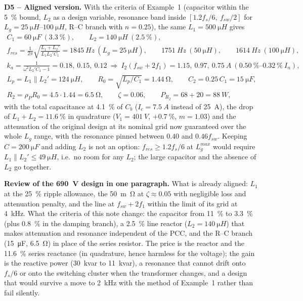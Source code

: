 \documentclass[10pt,a4paper]{scrartcl}
\newcommand{\fsw}{f_{sw}}
\newcommand{\fres}{f_{res}}
\newcommand{\Lg}{L_{g}}
\begin{document}
\begin{onehalfspace}
\textbf{D5 -- Aligned version.} With the criteria of Example~1 (capacitor within the \SI{5}{\percent} bound, $L_2$ as a design variable, resonance band inside $[1.2 f_s/6,\ \fsw/2]$ for $\Lg = \SIrange{25}{100}{\micro H}$, R--C branch with $n = 0.25$), the same $L_1 = \SI{500}{\micro H}$ gives
\begin{gather*}
C_1 = \SI{60}{\micro F}\ (\SI{3.3}{\percent}),\qquad L_2 = \SI{140}{\micro H}\ (\SI{2.5}{\percent}),\\
\fres = \frac{1}{2\pi}\sqrt{\frac{L_1 + L_2'}{L_1 L_2' C_1}} = \SI{1845}{Hz}\ (\Lg = \SI{25}{\micro H}),\qquad \SI{1751}{Hz}\ (\SI{50}{\micro H}),\qquad \SI{1614}{Hz}\ (\SI{100}{\micro H}),\\
k_a = \frac{1}{\omega^2 L_2' C_1 - 1} = 0.18,\ 0.15,\ 0.12\ \Rightarrow\ I_2(\fsw + 2f_1) = 1.15,\ 0.97,\ \SI{0.75}{A}\ (\SIrange{0.50}{0.32}{\percent}\ I_n),\\
L_p = L_1 \parallel L_2' = \SI{124}{\micro H},\qquad R_0 = \sqrt{L_p/C_1} = \SI{1.44}{\ohm},\qquad C_2 = 0.25\,C_1 = \SI{15}{\micro F},\\
R_2 = \rho_P R_0 = 4.5 \cdot 1.44 = \SI{6.5}{\ohm},\qquad \zeta = 0.06,\qquad P_{R_2} = 68 + 20 = \SI{88}{W},
\end{gather*}
with the total capacitance at \SI{4.1}{\percent} of $C_b$ ($I_c = \SI{7.5}{A}$ instead of \SI{25}{A}), the drop of $L_1 + L_2 = \SI{11.6}{\percent}$ in quadrature ($V_1 = \SI{401}{V}$, $+\SI{0.7}{\percent}$, $m = 1.03$) and the attenuation of the original design at its nominal grid now guaranteed over the whole $\Lg$ range, with the resonance pinned between $0.40$ and $0.46\fsw$. Keeping $C = \SI{200}{\micro F}$ and adding $L_2$ is not an option: $\fres \ge 1.2 f_s/6$ at $\Lg^{max}$ would require $L_1 \parallel L_2' \le \SI{49}{\micro H}$, i.e.\ no room for any $L_2$; the large capacitor and the absence of $L_2$ go together.

\begin{mybox}
\textbf{Review of the \SI{690}{V} design in one paragraph.} What is already aligned: $L_1$ at the \SI{25}{\percent} ripple allowance, the \SI{50}{m\ohm} at $\zeta \approx 0.05$ with negligible loss and attenuation penalty, and the line at $\fsw + 2f_1$ within the limit of its grid at \SI{4}{kHz}. What the criteria of this note change: the capacitor from \SI{11}{\percent} to \SI{3.3}{\percent} (plus \SI{0.8}{\percent} in the damping branch), a \SI{2.5}{\percent} line reactor ($L_2 = \SI{140}{\micro H}$) that makes attenuation and resonance independent of the PCC, and the R--C branch (\SI{15}{\micro F}, \SI{6.5}{\ohm}) in place of the series resistor. The price is the reactor and the \SI{11.6}{\percent} series reactance (in quadrature, hence harmless for the voltage); the gain is the reactive power (\SI{30}{kvar} to \SI{11}{kvar}), a resonance that cannot drift onto $f_s/6$ or onto the switching cluster when the transformer changes, and a design that would survive a move to \SI{2}{kHz} with the method of Example~1 rather than fail silently.
\end{mybox}


\end{onehalfspace}
\end{document}
